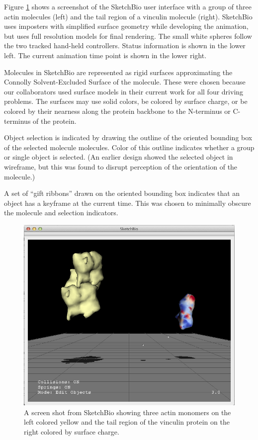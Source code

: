 \documentclass[twocolumn]{bmcart}%
\begin{document}
Figure \ref{fig:actin_vinculin} shows a screenshot of the SketchBio user interface with a group of three actin molecules (left) and the tail region of a vinculin molecule (right).
SketchBio uses imposters with simplified surface geometry while developing the animation, but uses full resolution models for final rendering.
The small white spheres follow the two tracked hand-held controllers. Status information is shown in the lower left.
The current animation time point is shown in the lower right.

Molecules in SketchBio are represented as rigid surfaces approximating the Connolly Solvent-Excluded Surface of the molecule.
These were chosen because our collaborators used surface models in their current work for all four driving problems.  The surfaces may use solid colors, be colored by surface charge, or be colored by their nearness along the protein backbone to the N-terminus or C-terminus of the protein.

Object selection is indicated by drawing the outline of the oriented bounding box of the selected molecule molecules. 
Color of this outline indicates whether a group or single object is selected.
(An earlier design showed the selected object in wireframe, but this was found to disrupt perception of the orientation of the molecule.)

A set of ``gift ribbons'' drawn on the oriented bounding box indicates that an object has a keyframe at the current time.
This was chosen to minimally obscure the molecule and selection indicators.

\begin{figure}[ht]
\centering
\includegraphics[width=0.9\columnwidth]{actinVinculin.png}
\caption{A screen shot from SketchBio showing three actin monomers on the left colored yellow and the tail region of the vinculin protein on the right colored by surface charge.}
\label{fig:actin_vinculin}
\end{figure}
\end{document}
